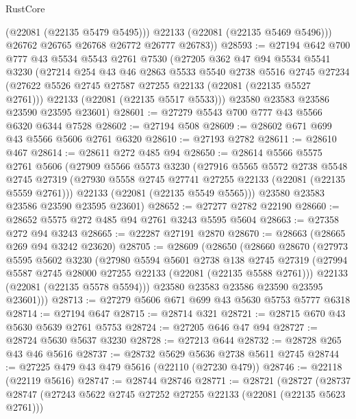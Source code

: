 \begin{lexlean}{RustCore}
\begin{coremodule}
            (@22081 (@22135 @5479 @5495)))
          @22133
          (@22081 (@22135 @5469 @5496)))
        @26762
        @26765
        @26768
        @26772
        @26777
        @26783))
@28593 := @27194
    @642
    @700
    @777
    @43
    @5534
    @5543
    @2761
    @7530
    (@27205
      @362
      @47
      @94
      @5534
      @5541
      @3230
      (@27214
        @254
        @43
        @46
        @2863
        @5533
        @5540
        @2738
        @5516
        @2745
        @27234
        (@27622 @5526 @2745 @27587 @27255 @22133 (@22081 (@22135 @5527 @2761)))
        @22133
        (@22081 (@22135 @5517 @5533)))
      @23580
      @23583
      @23586
      @23590
      @23595
      @23601)
@28601 := @27279 @5543 @700 @777 @43 @5566 @6320 @6344 @7528
@28602 := @27194 @508
@28609 := @28602 @671 @699 @43 @5566 @5606 @2761 @6320
@28610 := @27193 @2782
@28611 := @28610 @467
@28614 := @28611 @272 @485 @94
@28650 := @28614
    @5566
    @5575
    @2761
    @5606
    (@27909
      @5566
      @5573
      @3230
      (@27916
        @5565
        @5572
        @2738
        @5548
        @2745
        @27319
        (@27930 @5558 @2745 @27741 @27255 @22133 (@22081 (@22135 @5559 @2761)))
        @22133
        (@22081 (@22135 @5549 @5565)))
      @23580
      @23583
      @23586
      @23590
      @23595
      @23601)
@28652 := @27277 @2782 @22190
@28660 := @28652 @5575 @272 @485 @94 @2761 @3243 @5595 @5604
@28663 := @27358 @272 @94 @3243
@28665 := @22287 @27191 @2870
@28670 := @28663 (@28665 @269 @94 @3242 @23620)
@28705 := @28609
    (@28650
      (@28660
        @28670
        (@27973
          @5595
          @5602
          @3230
          (@27980
            @5594
            @5601
            @2738
            @138
            @2745
            @27319
            (@27994 @5587 @2745 @28000 @27255 @22133 (@22081 (@22135 @5588 @2761)))
            @22133
            (@22081 (@22135 @5578 @5594)))
          @23580
          @23583
          @23586
          @23590
          @23595
          @23601)))
@28713 := @27279 @5606 @671 @699 @43 @5630 @5753 @5777 @6318
@28714 := @27194 @647
@28715 := @28714 @321
@28721 := @28715 @670 @43 @5630 @5639 @2761 @5753
@28724 := @27205 @646 @47 @94
@28727 := @28724 @5630 @5637 @3230
@28728 := @27213 @644
@28732 := @28728 @265 @43 @46 @5616
@28737 := @28732 @5629 @5636 @2738 @5611 @2745
@28744 := @27225 @479 @43 @479 @5616 (@22110 (@27230 @479))
@28746 := @22118 (@22119 @5616)
@28747 := @28744 @28746
@28771 := @28721
    (@28727
      (@28737
        @28747
        (@27243 @5622 @2745 @27252 @27255 @22133 (@22081 (@22135 @5623 @2761)))

\end{coremodule}
\end{lexlean}
